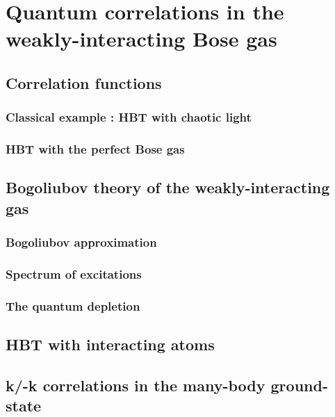 \chapter{Quantum correlations in the weakly-interacting Bose gas}

\section{Correlation functions}

\subsection{Classical example : HBT with chaotic light}

\subsection{HBT with the perfect Bose gas}

\section{Bogoliubov theory of the weakly-interacting gas}

\subsection{Bogoliubov approximation}

\subsection{Spectrum of excitations}

\subsection{The quantum depletion}

\section{HBT with interacting atoms}

\section{k/-k correlations in the many-body ground-state}
